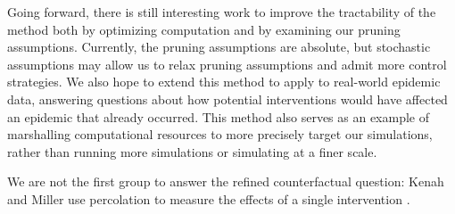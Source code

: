 \documentclass[PTRSB]{rsos}
\begin{document}
\begin{multicols}{2}
Going forward, there is still interesting work to improve the tractability of the method both by optimizing computation and by examining our pruning assumptions.
Currently, the pruning assumptions are absolute, but stochastic assumptions may allow us to relax pruning assumptions and admit more control strategies.
We also hope to extend this method to apply to real-world epidemic data, answering questions about how potential interventions would have affected an epidemic that already occurred.
This method also serves as an example of marshalling computational resources to more precisely target our simulations, rather than running more simulations or simulating at a finer scale.

We are not the first group to answer the refined counterfactual question: Kenah and Miller use percolation to measure the effects of a single intervention \cite{kenah-miller:2011}.
\enlargethispage{20pt}






\end{multicols}


\begin{multicols}{3}

\end{multicols}
\end{document}
